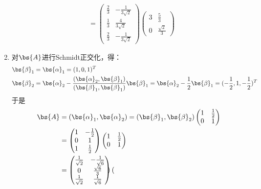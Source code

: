 \documentclass[12pt, a4paper, oneside, UTF8]{ctexbook}
\begin{document}
\begin{solution}
\begin{enumerate}[label=(\arabic*)]
\begin{align*}
            &=\begin{pmatrix}
                \frac{2}{3}& -\frac{1}{3\sqrt{2}}\\
                \frac{1}{3}& \frac{4}{3\sqrt{2}}\\
                \frac{2}{3}&-\frac{1}{3\sqrt{2}}
            \end{pmatrix}
            \begin{pmatrix}
                3 &\frac{5}{3}\\
                0 & \frac{\sqrt{2}}{3}
            \end{pmatrix}
        \end{align*}
        \item 对$\bs{A}$进行Schmidt正交化，得：
        \begin{align*}
            \bs{\beta}_1&=\bs{\alpha}_1=(1,0,1)^T \\
            \bs{\beta}_2&=\bs{\alpha}_2-\frac{(\bs{\alpha}_2,\bs{\beta}_1)}{(\bs{\beta}_1,\bs{\beta}_1)} \bs{\beta}_1
            =\bs{\alpha}_2-\frac{1}{2}\bs{\beta}_1=
            (-\frac{1}{2},1,-\frac{1}{2})^T
        \end{align*}
        于是
        \begin{align*}
            \bs{A}&=(\bs{\alpha}_1,\bs{\alpha}_2)
            =(\bs{\beta}_1,\bs{\beta}_2)\begin{pmatrix}
                1 &\frac{1}{2}\\
                0 & 1
            \end{pmatrix}\\
            &=\begin{pmatrix}
                1& -\frac{1}{2}\\
                0& 1\\
                1&\frac{1}{2}
            \end{pmatrix}
            \begin{pmatrix}
                1 &\frac{1}{2}\\
                0 & 1
            \end{pmatrix}\\
            &=\begin{pmatrix}
                \frac{1}{\sqrt{2}}& -\frac{1}{\sqrt{6}}\\
                0& \frac{\sqrt{6}}{3}\\
                \frac{1}{\sqrt{2}}&\frac{1}{\sqrt{6}}
            \end{pmatrix}
            \begin{pmatrix}

\end{pmatrix}
\end{align*}
\end{enumerate}
\end{solution}
\end{document}
